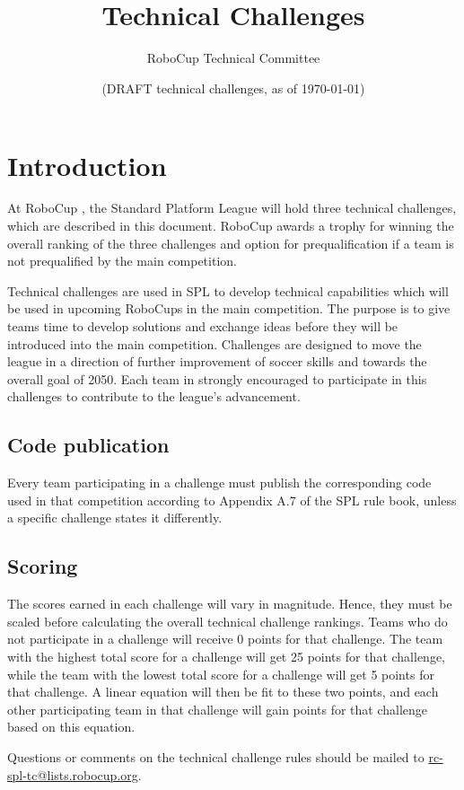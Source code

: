\documentclass[12pt]{article}
\title{\leaguename\\Technical Challenges}
\author{RoboCup Technical Committee}
\date{(DRAFT \RCYear technical challenges, as of \today)}
\begin{document}
\maketitle

\vfill
\tableofcontents
\setcounter{tocdepth}{3}
\thispagestyle{fancy}
\clearpage
\cfoot{\thepage}
\setcounter{page}{1}

\section{Introduction}
At RoboCup \RCYear, the Standard Platform League will hold three technical challenges, which are described in this document.
RoboCup \RCYear awards a trophy for winning the overall ranking of the three challenges and option for prequalification if a team is not prequalified by the main competition.

Technical challenges are used in SPL to develop technical capabilities which will be used in upcoming RoboCups in the main competition. The purpose is to give teams time to develop solutions and exchange ideas before they will be introduced into the main competition. Challenges are designed to move the league in a direction of further improvement  of soccer skills and towards the overall goal of 2050. Each team in strongly encouraged to participate in this challenges to contribute to the league's advancement.

\subsection{Code publication}
Every team participating in a challenge must publish the corresponding code used in that competition according to Appendix A.7 of the SPL rule book, unless a specific challenge states it differently.

\subsection{Scoring}
The scores earned in each challenge will vary in magnitude. Hence, they must be scaled before calculating the overall technical challenge rankings. Teams who do not participate in a challenge will receive 0 points for that challenge. The team with the highest total score for a challenge will get 25 points for that challenge, while the team with the lowest total score for a challenge will get 5 points for that challenge. A linear equation will then be fit to these two points, and each other participating team in that challenge will gain points for that challenge based on this equation.

Questions or comments on the technical challenge rules should be mailed to \url{rc-spl-tc@lists.robocup.org}.







\end{document}

